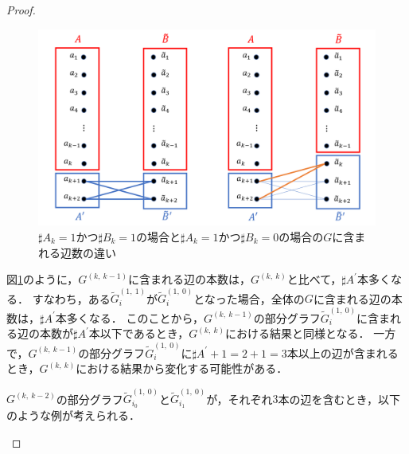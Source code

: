 \begin{proof}
\begin{enumerate}
\begin{enumerate}
\begin{figure}[t]
\centering
\includegraphics[width=\linewidth]{figs/BipartiteGraph-diff-ab.png}
\caption{$\sharp A_{k} =1$かつ$\sharp B_{k}=1$の場合と$\sharp A_{k}=1$かつ$\sharp B_{k}=0$の場合の$G$に含まれる辺数の違い}
\label{abが異なる場合}
\end{figure}

図\ref{abが異なる場合}のように，$G^{(k,~k-1)}$に含まれる辺の本数は，$G^{(k,~k)}$と比べて，$\sharp A^{\prime}$本多くなる．
すなわち，ある$\tilde{G}^{(1,~1)}_{i}$が$\tilde{G}^{(1,~0)}_{i}$となった場合，全体の$G$に含まれる辺の本数は，$\sharp A^{\prime}$本多くなる．
このことから，$G^{(k,~k-1)}$の部分グラフ$\tilde{G}^{(1,~0)}_{i}$に含まれる辺の本数が$\sharp A^{\prime}$本以下であるとき，$G^{(k,~k)}$における結果と同様となる．
一方で，$G^{(k,~k-1)}$の部分グラフ$\tilde{G}^{(1,~0)}_{i}$に$\sharp A^{\prime}+1=2+1=3$本以上の辺が含まれるとき，$G^{(k,~k)}$における結果から変化する可能性がある．

$G^{(k,~k-2)}$の部分グラフ$\tilde{G}^{(1,~0)}_{i_{0}}$と$\tilde{G}^{(1,~0)}_{i_{1}}$が，それぞれ$3$本の辺を含むとき，以下のような例が考えられる．


\end{enumerate}
\end{enumerate}
\end{proof}
